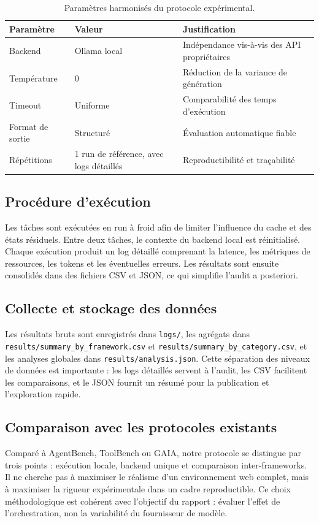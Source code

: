 \documentclass[11pt,a4paper]{article}
\begin{document}
\begin{table}[H]
\centering
\small
\begin{tabularx}{\textwidth}{@{}lXX@{}}
\toprule
Paramètre & Valeur & Justification \\
\midrule
Backend & Ollama local & Indépendance vis-à-vis des API propriétaires \\
Température & 0 & Réduction de la variance de génération \\
Timeout & Uniforme & Comparabilité des temps d'exécution \\
Format de sortie & Structuré & Évaluation automatique fiable \\
Répétitions & 1 run de référence, avec logs détaillés & Reproductibilité et traçabilité \\
\bottomrule
\end{tabularx}
\caption{Paramètres harmonisés du protocole expérimental.}
\label{tab:config}
\end{table}

\subsection{Procédure d'exécution}
Les tâches sont exécutées en run à froid afin de limiter l'influence du cache et des états résiduels. Entre deux tâches, le contexte du backend local est réinitialisé. Chaque exécution produit un log détaillé comprenant la latence, les métriques de ressources, les tokens et les éventuelles erreurs. Les résultats sont ensuite consolidés dans des fichiers CSV et JSON, ce qui simplifie l'audit a posteriori.

\subsection{Collecte et stockage des données}
Les résultats bruts sont enregistrés dans 
\texttt{logs/}, les agrégats dans \texttt{results/summary\_by\_framework.csv} et \texttt{results/summary\_by\_category.csv}, et les analyses globales dans \texttt{results/analysis.json}. Cette séparation des niveaux de données est importante : les logs détaillés servent à l'audit, les CSV facilitent les comparaisons, et le JSON fournit un résumé pour la publication et l'exploration rapide.

\subsection{Comparaison avec les protocoles existants}
Comparé à AgentBench, ToolBench ou GAIA, notre protocole se distingue par trois points : exécution locale, backend unique et comparaison inter-frameworks. Il ne cherche pas à maximiser le réalisme d'un environnement web complet, mais à maximiser la rigueur expérimentale dans un cadre reproductible. Ce choix méthodologique est cohérent avec l'objectif du rapport : évaluer l'effet de l'orchestration, non la variabilité du fournisseur de modèle.
\end{document}
